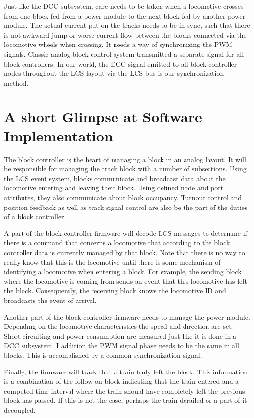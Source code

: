 Just like the DCC subsystem, care needs to be taken when a locomotive crosses from one block fed from a power module to the next block fed by another power module. The actual current put on the tracks needs to be in sync, such that there is not awkward jump or worse current flow between the blocks connected via the locomotive wheels when crossing. It needs a way of synchronizing the PWM signals. Classic analog block control system transmitted a separate signal for all block controllers. In our world, the DCC signal emitted to all block controller nodes throughout the LCS layout via the LCS bus is our synchronization method.

\section{A short Glimpse at Software Implementation}

The block controller is the heart of managing a block in an analog layout. It will be responsible for managing the track block with a number of subsections. Using the LCS event system, blocks communicate and broadcast data about the locomotive entering and leaving their block. Using defined node and port attributes, they also communicate about block occupancy. Turnout control and position feedback as well as track signal control are also be the part of the duties of a block controller.

A part of the block controller firmware will decode LCS messages to determine if there is a command that concerns a locomotive that according to the block controller data is currently managed by that block. Note that there is no way to really know that this is the locomotive until there is some mechanism of identifying a locomotive when entering a block. For example, the sending block where the locomotive is coming from sends an event that this locomotive has left the block. Consequently, the receiving block knows the locomotive ID and broadcasts the event of arrival.

Another part of the block controller firmware needs to manage the power module. Depending on the locomotive characteristics the speed and direction are set. Short circuiting and power consumption are measured just like it is done in a DCC subsystem. I addition the PWM signal phase needs to be the same in all blocks. This is accomplished by a common synchronization signal.

Finally, the firmware will track that a train truly left the block. This information is a combination of the follow-on block indicating that the train entered and a computed time interval where the train should have completely left the previous block has passed. If this is not the case, perhaps the train derailed or a part of it decoupled.

